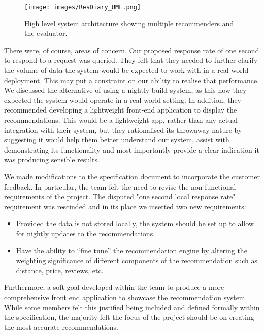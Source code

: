 \documentclass{l3proj}
\begin{document}
\begin{figure}[ht]
\centering
\texttt{[image: images/ResDiary\_UML.png]}
\caption{High level system architecture showing multiple recommenders and the evaluator.}
\label{fig:uml}
\end{figure}

There were, of course, areas of concern. Our proposed response rate of one second to respond to a request was queried. They felt that they needed to further clarify the volume of data the system would be expected to work with in a real world deployment. This may put a constraint on our ability to realise that performance. We discussed the alternative of using a nightly build system, as this how they expected the system would operate in a real world setting. In addition, they recommended developing a lightweight front-end application to display the recommendations. This would be a lightweight app, rather than any actual integration with their system, but they rationalised its throwaway nature by suggesting it would help them better understand our system, assist with demonstrating its functionality and most importantly provide a clear indication it was producing sensible results. 

We made modifications to the specification document to incorporate the customer feedback. In particular, the team felt the need to revise the non-functional requirements of the project. The disputed "one second local response rate" requirement was rescinded and in its place we inserted two new requirements:

\begin{itemize}
\item Provided the data is not stored locally, the system should be set up to allow for nightly updates to the recommendations.
\item Have the ability to “fine tune” the recommendation engine by altering the weighting significance of different components of the recommendation such as distance, price, 
reviews, etc.
\end{itemize}

Furthermore, a soft goal developed within the team to produce a more comprehensive front end application to showcase the recommendation system. While some members felt this justified being included and defined formally within the specification, the majority felt the focus of the project should be on creating the most accurate recommendations.
\end{document}
